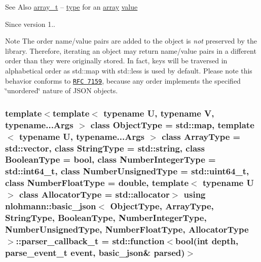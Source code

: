 \begin{DoxySeeAlso}{See Also}
\hyperlink{classnlohmann_1_1basic__json_ab00b882d39306d663c23dab110f5cae0}{array\-\_\-t} -- \hyperlink{classnlohmann_1_1basic__json_a5d466b240d0ba9f648d7fd4ff42359f5}{type} for an \hyperlink{classnlohmann_1_1basic__json_a5685815624b086caa532f41e853d4b0f}{array} \hyperlink{classnlohmann_1_1basic__json_a0a2cbbd95862a623e7dc5c37e67dead0}{value}
\end{DoxySeeAlso}
\begin{DoxySince}{Since}
version 1..
\end{DoxySince}
\begin{DoxyNote}{Note}
The order name/value pairs are added to the object is {\itshape not} preserved by the library. Therefore, iterating an object may return name/value pairs in a different order than they were originally stored. In fact, keys will be traversed in alphabetical order as {\ttfamily std\-::map} with {\ttfamily std\-::less} is used by default. Please note this behavior conforms to \href{http://rfc7159.net/rfc7159}{\tt R\-F\-C 7159}, because any order implements the specified \char`\"{}unordered\char`\"{} nature of J\-S\-O\-N objects. 
\end{DoxyNote}
\hypertarget{classnlohmann_1_1basic__json_a9e35475e2027520a78e09f460dbe048a}{
\subsubsection[{parser\-\_\-callback\-\_\-t}]{\setlength{\rightskip}{0pt plus 5cm}template$<$template$<$ typename U, typename V, typename...\-Args $>$ class Object\-Type = std\-::map, template$<$ typename U, typename...\-Args $>$ class Array\-Type = std\-::vector, class String\-Type  = std\-::string, class Boolean\-Type  = bool, class Number\-Integer\-Type  = std\-::int64\-\_\-t, class Number\-Unsigned\-Type  = std\-::uint64\-\_\-t, class Number\-Float\-Type  = double, template$<$ typename U $>$ class Allocator\-Type = std\-::allocator$>$ using {\bf nlohmann\-::basic\-\_\-json}$<$ Object\-Type, Array\-Type, String\-Type, Boolean\-Type, Number\-Integer\-Type, Number\-Unsigned\-Type, Number\-Float\-Type, Allocator\-Type $>$\-::{\bf parser\-\_\-callback\-\_\-t} =  std\-::function$<$bool(int depth, {\bf parse\-\_\-event\-\_\-t} event, {\bf basic\-\_\-json}\& parsed)$>$}}\label{classnlohmann_1_1basic__json_a9e35475e2027520a78e09f460dbe048a}


